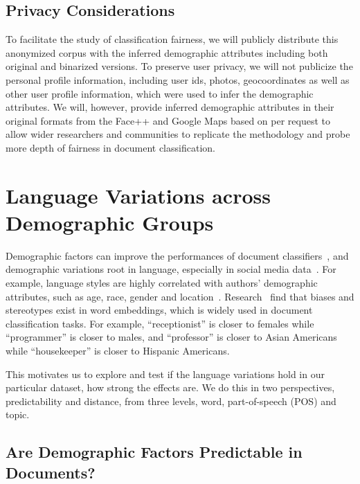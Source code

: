 \subsection{Privacy Considerations}
To facilitate the study of classification fairness, we will publicly distribute this anonymized corpus with the inferred demographic attributes including both original and binarized versions.
To preserve user privacy, we will not publicize the personal profile information, including user ids, photos, geocoordinates as well as other user profile information, which were used to infer the demographic attributes.
We will, however, provide inferred demographic attributes in their original formats from the Face++ and Google Maps based on per request to allow wider researchers and communities to replicate the methodology and probe more depth of fairness in document classification.


\section{Language Variations across Demographic Groups}
Demographic factors can improve the performances of document classifiers~\cite{hovy2015demographic}, and demographic variations root in language, especially in social media data~\cite{volkova2013exploring,hovy2015demographic}.
For example, language styles are highly correlated with authors' demographic attributes, such as age, race, gender and location~\cite{coulmas_2017,preoctiuc2018user}. Research~\cite{bolukbasi2016man,zhao2017men,garg2018word} find that biases and stereotypes exist in word embeddings, which is widely used in document classification tasks. For example, ``receptionist'' is closer to females while ``programmer'' is closer to males, and ``professor'' is closer to Asian Americans while ``housekeeper'' is closer to Hispanic Americans.

This motivates us to explore and test if the language variations hold in our particular dataset, how strong the effects are.
We do this in two perspectives, predictability and distance, from three levels, word, part-of-speech (POS) and topic.


\subsection{Are Demographic Factors Predictable in Documents?}
\label{subsec:pred}

